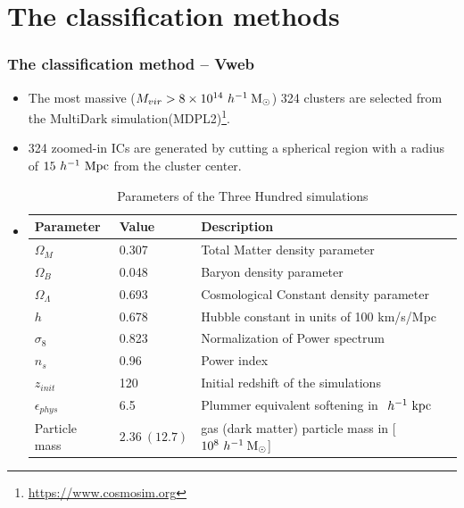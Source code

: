 \documentclass[aspectratio=1610]{beamer}
\newcommand{\hMsun}{~h^{-1}\>{\rm M_\odot}}
\newcommand{\Mpc}{~h^{-1}~{\rm Mpc}}
\newcommand{\Kpc}{~h^{-1}~{\rm kpc}}
\begin{document}
\section{The classification methods}
\begin{frame}
  \frametitle{The classification method -- Vweb}

  \begin{itemize}
    \item The most massive ($M_{vir} > 8\times 10^{14} \hMsun$) 324 clusters are selected from the MultiDark simulation(MDPL2)\footnote{\url{https://www.cosmosim.org}}.
    \item 324 zoomed-in ICs are generated by cutting a spherical region with a radius of \alert{$15 \Mpc$} from the cluster center.
    \item[]
      \begin{table}
        \fontsize{10}{10}\selectfont
        \caption{Parameters of the Three Hundred simulations}
        \begin{tabular}{lll}
          \hline
          Parameter& Value & Description\\
          \hline
          $\Omega_M$ & 0.307 & Total Matter density parameter\\
          $\Omega_B$ & 0.048 & Baryon density parameter\\
          $\Omega_\Lambda$ & 0.693 & Cosmological Constant density parameter\\
          $h$ & 0.678  & Hubble constant in units of 100 km/s/Mpc\\
          $\sigma_8$ & 0.823 & Normalization of Power spectrum\\
          $n_s$ & 0.96  & Power index\\
          $z_{init}$ & 120 & Initial redshift of the simulations \\
          $\epsilon_{phys}$ & 6.5 & Plummer equivalent softening in $\Kpc$ \\
          Particle mass & $2.36 \ (12.7) $ & gas (dark matter) particle mass in [$10^8 \hMsun$]\\
          \hline
        \end{tabular}
      \end{table}
\end{itemize}
\end{frame}
\end{document}
